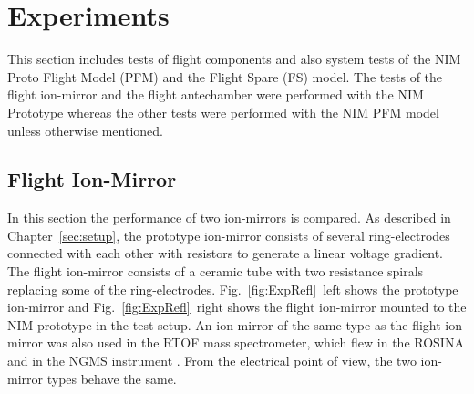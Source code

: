 \section{Experiments} \label{sec:Exp}
	
	This section includes tests of flight components and also system tests of the NIM Proto Flight Model (PFM) and the Flight Spare (FS) model. The tests of the flight ion-mirror and the flight antechamber were performed with the NIM Prototype whereas the other tests were performed with the NIM PFM model unless otherwise mentioned.

	\subsection{Flight Ion-Mirror}
	In this section the performance of two ion-mirrors is compared. As described in Chapter~\ref{sec:setup}, the prototype ion-mirror consists of several ring-electrodes connected with each other with resistors to generate a linear voltage gradient. The flight ion-mirror consists of a ceramic tube with two resistance spirals replacing some of the ring-electrodes. Fig.~\ref{fig:ExpRefl}~left shows the prototype ion-mirror and Fig.~\ref{fig:ExpRefl}~right shows the flight ion-mirror mounted to the NIM prototype in the test setup. An ion-mirror of the same type as the flight ion-mirror was also used in the RTOF mass spectrometer, which flew in the ROSINA \cite{Diss_Scherer} and in the NGMS instrument \cite{Diss_Hofer}. From the electrical point of view, the two ion-mirror types behave the same.\\
